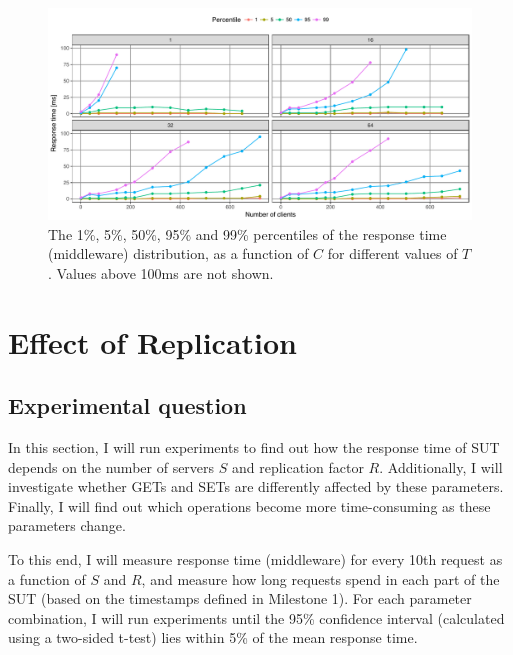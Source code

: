 \documentclass[11pt]{article}
\begin{document}
\begin{figure}[p]
\centering
\includegraphics[width=\textwidth]{../results/throughput/graphs/response_time_vs_clients.pdf}
\caption{The 1\%, 5\%, 50\%, 95\% and 99\% percentiles of the response time (middleware) distribution, as a function of $C$ for different values of $T$. Values above 100ms are not shown.}
\label{fig:exp1:res:responsetime}
\end{figure}



\clearpage
\section{Effect of Replication}
\label{sec:exp2}

\subsection{Experimental question}

In this section, I will run experiments to find out how the response time of SUT depends on the number of servers $S$ and replication factor $R$. Additionally, I will investigate whether GETs and SETs are differently affected by these parameters. Finally, I will find out which operations become more time-consuming as these parameters change.

To this end, I will measure response time (middleware) for every 10th request as a function of $S$ and $R$, and measure how long requests spend in each part of the SUT (based on the timestamps defined in Milestone 1). For each parameter combination, I will run experiments until the 95\% confidence interval (calculated using a two-sided t-test) lies within 5\% of the mean response time.
\end{document}
